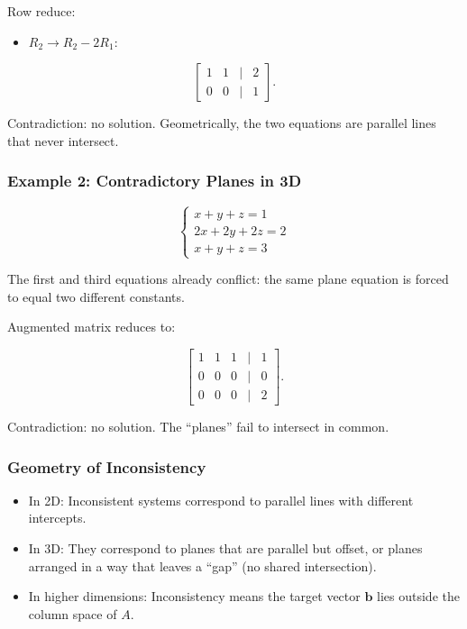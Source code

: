 \documentclass[
  letterpaper,
  DIV=11,
  numbers=noendperiod]{scrreprt}
\providecommand{\tightlist}{%
  \setlength{\itemsep}{0pt}\setlength{\parskip}{0pt}}
\begin{document}
Row reduce:

\begin{itemize}
\tightlist
\item
  \(R_2 \to R_2 - 2R_1\):
\end{itemize}

\[
\begin{bmatrix}  
1 & 1 & | & 2 \\  
0 & 0 & | & 1  
\end{bmatrix}.
\]

Contradiction: no solution. Geometrically, the two equations are
parallel lines that never intersect.

\subsubsection{Example 2: Contradictory Planes in
3D}\label{example-2-contradictory-planes-in-3d}

\[
\begin{cases}  
x + y + z = 1 \\  
2x + 2y + 2z = 2 \\  
x + y + z = 3  
\end{cases}
\]

The first and third equations already conflict: the same plane equation
is forced to equal two different constants.

Augmented matrix reduces to:

\[
\begin{bmatrix}  
1 & 1 & 1 & | & 1 \\  
0 & 0 & 0 & | & 0 \\  
0 & 0 & 0 & | & 2  
\end{bmatrix}.
\]

Contradiction: no solution. The ``planes'' fail to intersect in common.

\subsubsection{Geometry of
Inconsistency}\label{geometry-of-inconsistency}

\begin{itemize}
\tightlist
\item
  In 2D: Inconsistent systems correspond to parallel lines with
  different intercepts.
\item
  In 3D: They correspond to planes that are parallel but offset, or
  planes arranged in a way that leaves a ``gap'' (no shared
  intersection).
\item
  In higher dimensions: Inconsistency means the target vector
  \(\mathbf{b}\) lies outside the column space of \(A\).
\end{itemize}
\end{document}
